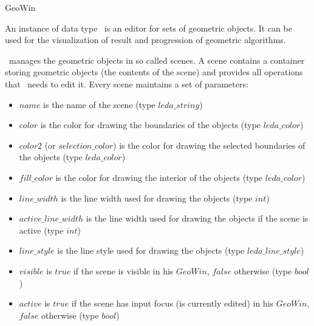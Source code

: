 


\ccDefGlobalScope{}
\begin{ccRefClass}{GeoWin}

\ccDefinition




    An instance of data type \ccRefName\ is an editor 
    for sets of geometric objects. It can be used for the visualization of result
    and progression of geometric algorithms.
    
    \ccRefName\ manages the geometric objects in so called scenes.
    A scene contains a container storing geometric objects (the contents of the
    scene) and provides all operations that \ccRefName\ needs to edit it. 
    Every scene maintains a set of parameters:
    
    \begin{itemize}
    \item $name$ is the name of the scene 
          (type $leda\_string$)
    \item $color$ is the color for drawing the boundaries of the objects
          (type $leda\_color$)
    \item $color2$ (or $selection\_color$) is the color for drawing the selected boundaries of the objects
          (type $leda\_color$)
    \item $fill\_color$ is the color for drawing the interior of the objects
          (type $leda\_color$)
    \item $line\_width$ is the line width used for drawing the objects
          (type $int$)
    \item $active\_line\_width$ is the line width used for drawing the objects if the
          scene is active (type $int$)
    \item $line\_style$ is the line style used for drawing the objects
          (type $leda\_line\_style$)
    \item $visible$ is $true$ if the scene is visible in his $GeoWin$, $false$ otherwise
          (type $bool$)
    \item $active$ is $true$ if the scene has input focus (is currently edited) in
          his $GeoWin$, $false$ otherwise (type $bool$)
    \end{itemize}
    

\end{ccRefClass}
